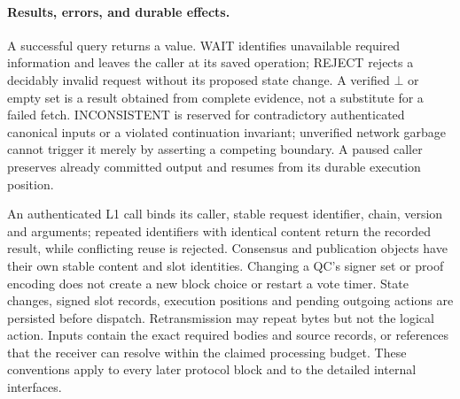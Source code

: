 \paragraph{Results, errors, and durable effects.}
A successful query returns a value. \textsf{WAIT} identifies unavailable
required information and leaves the caller at its saved operation;
\textsf{REJECT} rejects a decidably invalid request without its proposed
state change. A verified $\bot$ or empty set is a result obtained from
complete evidence, not a substitute for a failed fetch.
\textsf{INCONSISTENT} is reserved for contradictory authenticated
canonical inputs or a violated continuation invariant; unverified
network garbage cannot trigger it merely by asserting a competing
boundary. A paused caller preserves already committed output and
resumes from its durable execution position.

An authenticated L1 call binds its caller, stable request identifier,
chain, version and arguments; repeated identifiers with identical
content return the recorded result, while conflicting reuse is rejected.
Consensus and publication objects have their own stable content and
slot identities. Changing a QC's signer set or proof encoding does not
create a new block choice or restart a vote timer. State changes, signed
slot records, execution positions and pending outgoing actions are
persisted before dispatch. Retransmission may repeat bytes but not the
logical action. Inputs contain the exact required bodies and source
records, or references that the receiver can resolve within the claimed
processing budget. These conventions apply to every later protocol
block and to the detailed internal interfaces.
